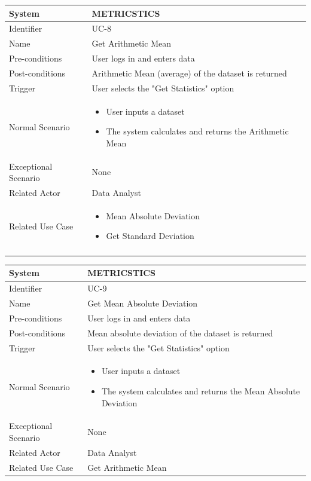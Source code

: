 \documentclass[letterpaper,12pt]{article}
\begin{document}
\begin{itemize}
\begin{tabular}{|p{1.45in}|p{3.65in}|}
    \hline
    System & METRICSTICS \\
    \hline
    Identifier & UC-8 \\
    \hline
    Name & Get Arithmetic Mean \\
    \hline
    Pre-conditions & User logs in and enters data\\
   \hline
    Post-conditions & Arithmetic Mean (average) of the dataset is returned\\
   \hline
    Trigger & User selects the "Get Statistics" option \\
    \hline
    Normal Scenario &  \begin{itemize}
   \item User inputs a dataset
   \item The system calculates and returns the Arithmetic Mean
   \end{itemize}\\
    \hline
    Exceptional Scenario & None \\
    \hline
    Related Actor& Data Analyst\\
    \hline
    Related Use Case & \begin{itemize}
   \item Mean Absolute Deviation
   \item Get Standard Deviation
   \end{itemize}\\\\
\hline
\end{tabular}
\bigskip
\bigskip

\begin{tabular}{|p{1.45in}|p{3.65in}|}
    \hline
    System & METRICSTICS \\
    \hline
    Identifier & UC-9 \\
    \hline
    Name &  Get Mean Absolute Deviation \\
    \hline
    Pre-conditions & User logs in and enters data\\
   \hline
    Post-conditions & Mean absolute deviation of the dataset is returned\\
   \hline
    Trigger & User selects the "Get Statistics" option \\
    \hline
    Normal Scenario &  \begin{itemize}
   \item User inputs a dataset
   \item The system calculates and returns the Mean Absolute Deviation
   \end{itemize}\\
    \hline
    Exceptional Scenario & None \\
    \hline
    Related Actor& Data Analyst\\
    \hline
    Related Use Case & Get Arithmetic Mean \\
\hline
\end{tabular}
\bigskip
\bigskip


\end{itemize}
\end{document}
